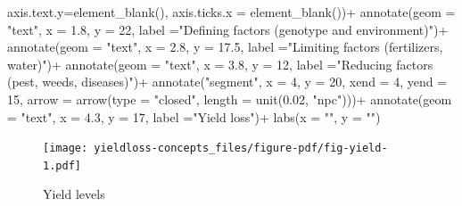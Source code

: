 \documentclass[
  letterpaper,
]{book}
\newenvironment{Shaded}{\begin{snugshade}}{\end{snugshade}}
\newcommand{\AttributeTok}[1]{\textcolor[rgb]{0.40,0.45,0.13}{#1}}
\newcommand{\DecValTok}[1]{\textcolor[rgb]{0.68,0.00,0.00}{#1}}
\newcommand{\FloatTok}[1]{\textcolor[rgb]{0.68,0.00,0.00}{#1}}
\newcommand{\FunctionTok}[1]{\textcolor[rgb]{0.28,0.35,0.67}{#1}}
\newcommand{\NormalTok}[1]{\textcolor[rgb]{0.00,0.23,0.31}{#1}}
\newcommand{\SpecialCharTok}[1]{\textcolor[rgb]{0.37,0.37,0.37}{#1}}
\newcommand{\StringTok}[1]{\textcolor[rgb]{0.13,0.47,0.30}{#1}}
\begin{document}
\begin{Shaded}
\begin{Highlighting}[]
        \AttributeTok{axis.text.y=}\FunctionTok{element\_blank}\NormalTok{(),}
        \AttributeTok{axis.ticks.x =} \FunctionTok{element\_blank}\NormalTok{())}\SpecialCharTok{+}
  \FunctionTok{annotate}\NormalTok{(}\AttributeTok{geom =} \StringTok{"text"}\NormalTok{, }\AttributeTok{x =} \FloatTok{1.8}\NormalTok{, }\AttributeTok{y =} \DecValTok{22}\NormalTok{, }\AttributeTok{label =}\StringTok{"Defining factors }
\StringTok{           (genotype and environment)"}\NormalTok{)}\SpecialCharTok{+}
  \FunctionTok{annotate}\NormalTok{(}\AttributeTok{geom =} \StringTok{"text"}\NormalTok{, }\AttributeTok{x =} \FloatTok{2.8}\NormalTok{, }\AttributeTok{y =} \FloatTok{17.5}\NormalTok{, }\AttributeTok{label =}\StringTok{"Limiting factors}
\StringTok{        (fertilizers, water)"}\NormalTok{)}\SpecialCharTok{+}
  \FunctionTok{annotate}\NormalTok{(}\AttributeTok{geom =} \StringTok{"text"}\NormalTok{, }\AttributeTok{x =} \FloatTok{3.8}\NormalTok{, }\AttributeTok{y =} \DecValTok{12}\NormalTok{, }\AttributeTok{label =}\StringTok{"Reducing factors}
\StringTok{           (pest, weeds, diseases)"}\NormalTok{)}\SpecialCharTok{+}
  \FunctionTok{annotate}\NormalTok{(}\StringTok{"segment"}\NormalTok{, }\AttributeTok{x =} \DecValTok{4}\NormalTok{, }\AttributeTok{y =} \DecValTok{20}\NormalTok{, }\AttributeTok{xend =} \DecValTok{4}\NormalTok{, }\AttributeTok{yend =} \DecValTok{15}\NormalTok{,}
         \AttributeTok{arrow =} \FunctionTok{arrow}\NormalTok{(}\AttributeTok{type =} \StringTok{"closed"}\NormalTok{, }\AttributeTok{length =} \FunctionTok{unit}\NormalTok{(}\FloatTok{0.02}\NormalTok{, }\StringTok{"npc"}\NormalTok{)))}\SpecialCharTok{+}
  \FunctionTok{annotate}\NormalTok{(}\AttributeTok{geom =} \StringTok{"text"}\NormalTok{, }\AttributeTok{x =} \FloatTok{4.3}\NormalTok{, }\AttributeTok{y =} \DecValTok{17}\NormalTok{, }\AttributeTok{label =}\StringTok{"Yield loss"}\NormalTok{)}\SpecialCharTok{+}
  \FunctionTok{labs}\NormalTok{(}\AttributeTok{x =} \StringTok{""}\NormalTok{, }\AttributeTok{y =} \StringTok{""}\NormalTok{)}
\end{Highlighting}
\end{Shaded}

\begin{figure}[H]

{\centering \texttt{[image: yieldloss-concepts\_files/figure-pdf/fig-yield-1.pdf]}

}

\caption{\label{fig-yield}Yield levels}

\end{figure}
\end{document}
